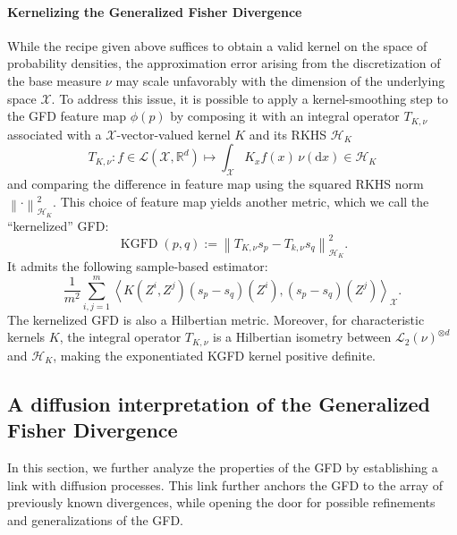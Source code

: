 \documentclass{uai2023} %
\begin{document}
\paragraph{Kernelizing the Generalized Fisher Divergence}

While the recipe given above suffices to obtain a valid kernel on the space of
probability densities, the approximation error arising from the discretization
of the base measure $\nu$ may scale unfavorably with the dimension of the
underlying space $\mathcal{X}$. To address this issue, it is possible to apply
a kernel-smoothing step to the GFD feature map $ \phi(p) $ by composing it with
an integral operator $ T_{K, \nu} $ associated with a $ \mathcal  X
$-vector-valued kernel $ K $ and its RKHS $ \mathcal  H_{ K} $
\begin{equation*}
T_{K, \nu} \colon f \in \mathcal  L(\mathcal  X, \mathbb{R}^d)  \longmapsto \int_{\mathcal{X}} K_x f(x)  \, \nu(\mathrm{d}x) \in \mathcal  H_{ K}
\end{equation*}
and comparing the difference in feature map using the squared RKHS norm $ \left
\| \cdot \right \|_{\mathcal{H}_K}^{2} $. This choice of feature map yields
another metric, which we call the ``kernelized'' GFD:
\begin{equation*}
\operatorname{KGFD}(p, q) := \left \| T_{K, \nu} s_p - T_{k, \nu} s_q \right \|_{\mathcal  H_{K}}^{2}.
\end{equation*}
It admits the following sample-based estimator:
\begin{equation*}
    \frac{1}{m^2}
    \sum_{i,j=1}^{m}\left \langle  K(Z^{i},
    Z^{j}) (s_p - s_q)(Z^{i}), (s_p - s_q)(Z^{j}) \right \rangle_{\mathcal  X}.
\end{equation*}
The kernelized GFD is also a Hilbertian metric. Moreover, for characteristic
kernels $ K $, the integral operator $ T_{K,\nu} $ is a Hilbertian isometry
between $ \mathcal  L_2(\nu)^{\otimes d}$ and $ \mathcal  H_{K} $, making the
exponentiated KGFD kernel positive definite.

\subsection{A diffusion interpretation of the Generalized Fisher Divergence}
In this section, we further analyze the properties of the GFD by establishing a
link with diffusion processes. This link further anchors the GFD to the
array of previously known divergences, while opening the door for possible
refinements and generalizations of the GFD.
\end{document}
